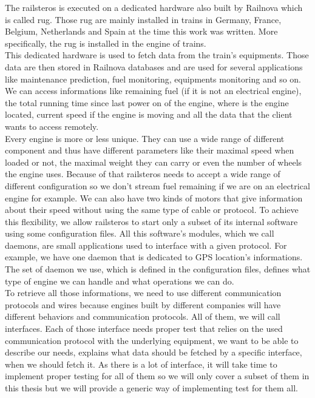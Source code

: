 \documentclass[12pt]{article}
\theoremstyle{definition}
\theoremstyle{definition}
\theoremstyle{remark}
\begin{document}
The \gls{railsteros} is executed on a dedicated hardware also built by Railnova which is called \gls{rug}. Those \gls{rug} are mainly installed in trains in Germany, France, Belgium, Netherlands and Spain at the time this work was written. More specifically, the \gls{rug} is installed in the engine of trains.\\

This dedicated hardware is used to fetch data from the train's equipments. Those data are then stored in Railnova databases and are used for several applications like maintenance prediction, fuel monitoring, equipments monitoring and so on. We can access informations like remaining fuel (if it is not an electrical engine), the total running time since last power on of the engine, where is the engine located, current speed if the engine is moving and all the data that the client wants to access remotely.\\

Every engine is more or less unique. They can use a wide range of different component and thus have different parameters like their maximal speed when loaded or not, the maximal weight they can carry or even the number of wheels the engine uses. Because of that \gls{railsteros} needs to accept a wide range of different configuration so we don't stream fuel remaining if we are on an electrical engine for example. We can also have two kinds of motors that give information about their speed without using the same type of cable or protocol. To achieve this flexibility, we allow \gls{railsteros} to start only a subset of its internal software using some configuration files. All this software's modules, which we call \gls{daemons}, are small applications used to interface with a given protocol. For example, we have one daemon that is dedicated to GPS location's informations. The set of daemon we use, which is defined in the configuration files, defines what type of engine we can handle and what operations we can do.\\

To retrieve all those informations, we need to use different communication protocols and wires because engines built by different companies will have different behaviors and communication protocols. All of them, we will call interfaces. Each of those interface needs proper test that relies on the used communication protocol with the underlying equipment, we want to be able to describe our needs, explains what data should be fetched by a specific interface, when we should fetch it. As there is a lot of interface, it will take time to implement proper testing for all of them so we will only cover a subset of them in this thesis but we will provide a generic way of implementing test for them all.
\end{document}
